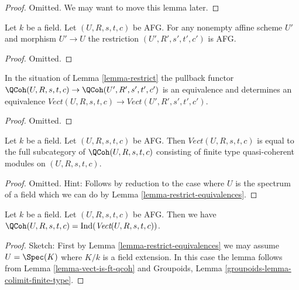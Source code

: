 \begin{proof}
Omitted. We may want to move this lemma later.
\end{proof}

\begin{lemma}
\label{lemma-restrict}
Let $k$ be a field. Let $(U, R, s, t, c)$ be AFG.
For any nonempty affine scheme $U'$ and morphism $U' \to U$ the
restriction $(U', R', s', t', c')$ is AFG.
\end{lemma}

\begin{proof}
Omitted.
\end{proof}

\begin{lemma}
\label{lemma-restrict-equivalences}
In the situation of Lemma \ref{lemma-restrict} the pullback functor
$\QCoh(U, R, s, t, c) \to \QCoh(U', R', s', t', c')$ is an equivalence
and determines an equivalence
$\textit{Vect}(U, R, s, t, c) \to \textit{Vect}(U', R', s', t', c')$.
\end{lemma}

\begin{proof}
Omitted.
\end{proof}

\begin{lemma}
\label{lemma-vect-is-ft-qcoh}
Let $k$ be a field. Let $(U, R, s, t, c)$ be AFG.
Then $\textit{Vect}(U, R, s, t, c)$ is equal to the
full subcategory of $\QCoh(U, R, s, t, c)$ consisting of
finite type quasi-coherent modules on $(U, R, s, t, c)$.
\end{lemma}

\begin{proof}
Omitted. Hint:
Follows by reduction to the case where $U$ is the spectrum of
a field which we can do by Lemma \ref{lemma-restrict-equivalences}.
\end{proof}

\begin{lemma}
\label{lemma-colimit}
Let $k$ be a field. Let $(U, R, s, t, c)$ be AFG.
Then we have
$\QCoh(U, R, s, t, c) = \text{Ind}(\textit{Vect}(U, R, s, t, c))$.
\end{lemma}

\begin{proof}
Sketch: First by Lemma \ref{lemma-restrict-equivalences}
we may assume $U = \Spec(K)$ where $K/k$ is a field extension.
In this case the lemma follows from Lemma \ref{lemma-vect-is-ft-qcoh}
and Groupoids, Lemma \ref{groupoids-lemma-colimit-finite-type}.
\end{proof}





